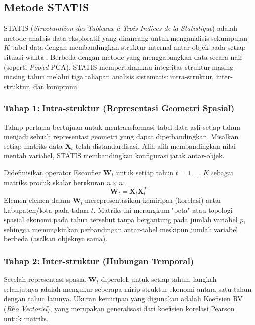 \documentclass[a4paper]{article}
\theoremstyle{definition} %
\begin{document}
\subsection{Metode STATIS}

STATIS (\textit{Structuration des Tableaux à Trois Indices de la Statistique}) adalah metode analisis data eksploratif yang dirancang untuk menganalisis sekumpulan $K$ tabel data dengan membandingkan struktur internal antar-objek pada setiap situasi waktu \citet{lavit94}. Berbeda dengan metode yang menggabungkan data secara naif (seperti \textit{Pooled} PCA), STATIS mempertahankan integritas struktur masing-masing tahun melalui tiga tahapan analisis sistematis: intra-struktur, inter-struktur, dan kompromi.

\subsubsection{Tahap 1: Intra-struktur (Representasi Geometri Spasial)}
Tahap pertama bertujuan untuk mentransformasi tabel data asli setiap tahun menjadi sebuah representasi geometri yang dapat diperbandingkan. Misalkan setiap matriks data $\mathbf{X}_t$ telah distandardisasi. Alih-alih membandingkan nilai mentah variabel, STATIS membandingkan konfigurasi jarak antar-objek.

Didefinisikan operator Escoufier $\mathbf{W}_t$ untuk setiap tahun $t=1, \dots, K$ sebagai matriks produk skalar berukuran $n \times n$:
\begin{equation}
	\mathbf{W}_t = \mathbf{X}_t \mathbf{X}_t^T
\end{equation}
Elemen-elemen dalam $\mathbf{W}_t$ merepresentasikan kemiripan (korelasi) antar kabupaten/kota pada tahun $t$. Matriks ini merangkum "peta" atau topologi spasial ekonomi pada tahun tersebut tanpa bergantung pada jumlah variabel $p$, sehingga memungkinkan perbandingan antar-tabel meskipun jumlah variabel berbeda (asalkan objeknya sama).

\subsubsection{Tahap 2: Inter-struktur (Hubungan Temporal)}
Setelah representasi spasial $\mathbf{W}_t$ diperoleh untuk setiap tahun, langkah selanjutnya adalah mengukur seberapa mirip struktur ekonomi antara satu tahun dengan tahun lainnya. Ukuran kemiripan yang digunakan adalah Koefisien RV (\textit{Rho Vectoriel}), yang merupakan generalisasi dari koefisien korelasi Pearson untuk matriks.
\end{document}
